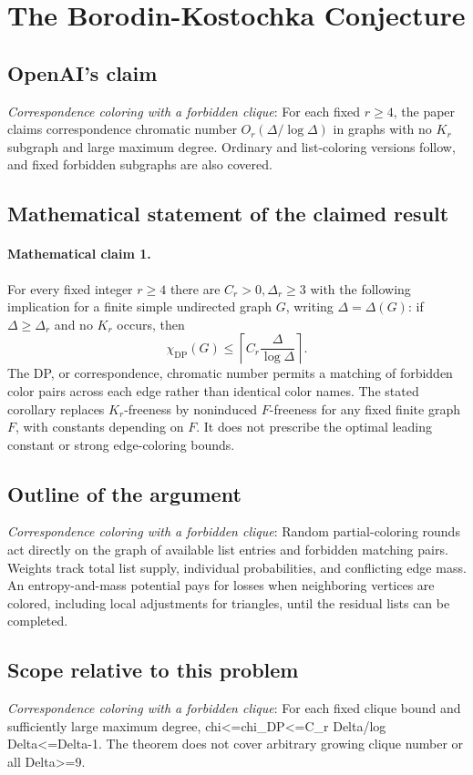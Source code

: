 \documentclass[11pt]{article}
\begin{document}
\section*{The Borodin-Kostochka Conjecture}

\subsection{OpenAI's claim}
\textit{Correspondence coloring with a forbidden clique}: For each fixed $r\ge4$, the paper claims correspondence chromatic number $O_r(\Delta/\log\Delta)$ in graphs with no $K_r$ subgraph and large maximum degree. Ordinary and list-coloring versions follow, and fixed forbidden subgraphs are also covered.

\subsection{Mathematical statement of the claimed result}
\paragraph{Mathematical claim 1.} For every fixed integer $r\ge4$ there are $C_r>0,\Delta_r\ge3$ with the following implication for a finite simple undirected graph $G$, writing $\Delta=\Delta(G)$: if $\Delta\ge\Delta_r$ and no $K_r$ occurs, then \[\chi_{\mathrm{DP}}(G)\le\left\lceil C_r\frac\Delta{\log\Delta}\right\rceil.\] The DP, or correspondence, chromatic number permits a matching of forbidden color pairs across each edge rather than identical color names. The stated corollary replaces $K_r$-freeness by noninduced $F$-freeness for any fixed finite graph $F$, with constants depending on $F$. It does not prescribe the optimal leading constant or strong edge-coloring bounds.

\subsection{Outline of the argument}
\textit{Correspondence coloring with a forbidden clique}: Random partial-coloring rounds act directly on the graph of available list entries and forbidden matching pairs. Weights track total list supply, individual probabilities, and conflicting edge mass. An entropy-and-mass potential pays for losses when neighboring vertices are colored, including local adjustments for triangles, until the residual lists can be completed.

\subsection{Scope relative to this problem}
\textit{Correspondence coloring with a forbidden clique}: For each fixed clique bound and sufficiently large maximum degree, chi<=chi\_DP<=C\_r Delta/log Delta<=Delta-1. The theorem does not cover arbitrary growing clique number or all Delta>=9.
\end{document}
